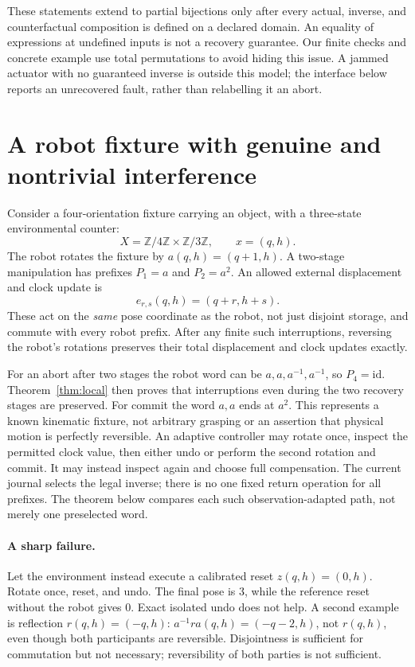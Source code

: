 \documentclass[11pt]{article}
\newcommand{\id}{\mathrm{id}}
\begin{document}
These statements extend to partial bijections only after every actual, inverse, and counterfactual composition is defined on a declared domain. An equality of expressions at undefined inputs is not a recovery guarantee. Our finite checks and concrete example use total permutations to avoid hiding this issue. A jammed actuator with no guaranteed inverse is outside this model; the interface below reports an unrecovered fault, rather than relabelling it an abort.

\section{A robot fixture with genuine and nontrivial interference}
Consider a four-orientation fixture carrying an object, with a three-state environmental counter:
\[
 X=\mathbb Z/4\mathbb Z\times\mathbb Z/3\mathbb Z,
 \qquad x=(q,h).
\]
The robot rotates the fixture by $a(q,h)=(q+1,h)$. A two-stage manipulation has prefixes $P_1=a$ and $P_2=a^2$. An allowed external displacement and clock update is
\[
 e_{r,s}(q,h)=(q+r,h+s).
\]
These act on the \emph{same} pose coordinate as the robot, not just disjoint storage, and commute with every robot prefix. After any finite such interruptions, reversing the robot's rotations preserves their total displacement and clock updates exactly.

For an abort after two stages the robot word can be
$a,a,a^{-1},a^{-1}$, so $P_4=\id$. Theorem~\ref{thm:local} then proves that interruptions even during the two recovery stages are preserved. For commit the word $a,a$ ends at $a^2$. This represents a known kinematic fixture, not arbitrary grasping or an assertion that physical motion is perfectly reversible. An adaptive controller may rotate once, inspect the permitted clock value, then either undo or perform the second rotation and commit. It may instead inspect again and choose full compensation. The current journal selects the legal inverse; there is no one fixed return operation for all prefixes. The theorem below compares each such observation-adapted path, not merely one preselected word.

\paragraph{A sharp failure.}
Let the environment instead execute a calibrated reset $z(q,h)=(0,h)$. Rotate once, reset, and undo. The final pose is $3$, while the reference reset without the robot gives $0$. Exact isolated undo does not help. A second example is reflection $r(q,h)=(-q,h)$: $a^{-1}ra(q,h)=(-q-2,h)$, not $r(q,h)$, even though both participants are reversible. Disjointness is sufficient for commutation but not necessary; reversibility of both parties is not sufficient.
\end{document}
